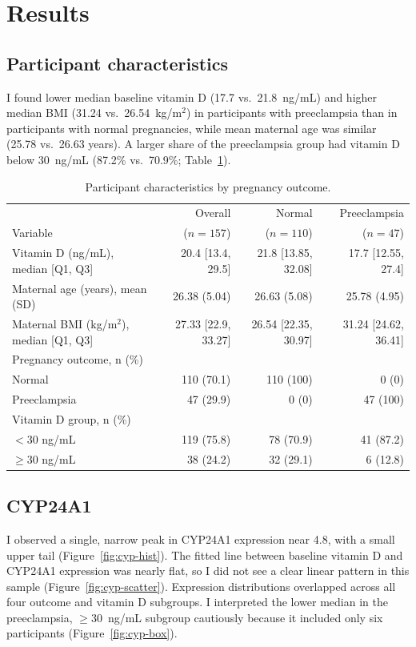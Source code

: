 \documentclass[11pt]{article}
\begin{document}
\section{Results}

\subsection{Participant characteristics}
I found lower median baseline vitamin D (17.7 vs.\ 21.8~ng/mL) and
higher median BMI (31.24 vs.\ 26.54~kg/m$^2$) in participants with
preeclampsia than in participants with normal pregnancies, while mean
maternal age was similar (25.78 vs.\ 26.63 years). A larger share of the
preeclampsia group had vitamin D below 30~ng/mL (87.2\% vs.\ 70.9\%;
Table~\ref{tab:one}).

\begin{table}[H]
\centering
\caption{Participant characteristics by pregnancy outcome.}
\label{tab:one}
\footnotesize
\begin{tabular}{|l|r|r|r|}
\hline
 & Overall & Normal & Preeclampsia \\
Variable & ($n = 157$) & ($n = 110$) & ($n = 47$) \\
\hline
Vitamin D (ng/mL), median [Q1, Q3] & 20.4 [13.4, 29.5] & 21.8 [13.85, 32.08] & 17.7 [12.55, 27.4] \\
Maternal age (years), mean (SD) & 26.38 (5.04) & 26.63 (5.08) & 25.78 (4.95) \\
Maternal BMI (kg/m$^2$), median [Q1, Q3] & 27.33 [22.9, 33.27] & 26.54 [22.35, 30.97] & 31.24 [24.62, 36.41] \\
\hline
Pregnancy outcome, n (\%) & & & \\
Normal & 110 (70.1) & 110 (100) & 0 (0) \\
Preeclampsia & 47 (29.9) & 0 (0) & 47 (100) \\
\hline
Vitamin D group, n (\%) & & & \\
$<$30 ng/mL & 119 (75.8) & 78 (70.9) & 41 (87.2) \\
$\geq$30 ng/mL & 38 (24.2) & 32 (29.1) & 6 (12.8) \\
\hline
\end{tabular}
\end{table}

\subsection{CYP24A1}
I observed a single, narrow peak in CYP24A1 expression near 4.8, with a
small upper tail (Figure~\ref{fig:cyp-hist}). The fitted line between
baseline vitamin D and CYP24A1 expression was nearly flat, so I did not
see a clear linear pattern in this sample (Figure~\ref{fig:cyp-scatter}).
Expression distributions overlapped across all four outcome and vitamin D
subgroups. I interpreted the lower median in the preeclampsia,
$\geq$30~ng/mL subgroup cautiously because it included only six
participants (Figure~\ref{fig:cyp-box}).
\end{document}
